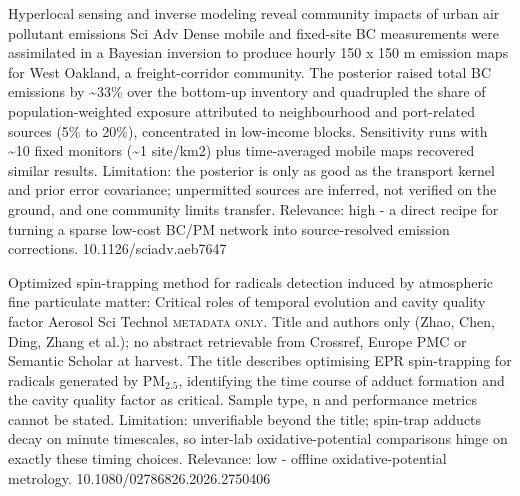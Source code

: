 \documentclass[10pt]{article}
\begin{document}
\par{}\baselineskip{}\baselineskip
{}

{Hyperlocal sensing and inverse modeling reveal community impacts of urban air pollutant emissions}
{Sci Adv}
{Dense mobile and fixed-site BC measurements were assimilated in a Bayesian inversion to produce hourly 150 x 150 m emission maps for West Oakland, a freight-corridor community. The posterior raised total BC emissions by \textasciitilde{}33\% over the bottom-up inventory and quadrupled the share of population-weighted exposure attributed to neighbourhood and port-related sources (5\% to 20\%), concentrated in low-income blocks. Sensitivity runs with \textasciitilde{}10 fixed monitors (\textasciitilde{}1 site/km2) plus time-averaged mobile maps recovered similar results. Limitation: the posterior is only as good as the transport kernel and prior error covariance; unpermitted sources are inferred, not verified on the ground, and one community limits transfer. Relevance: high - a direct recipe for turning a sparse low-cost BC/PM network into source-resolved emission corrections.}
{10.1126/sciadv.aeb7647}

{Optimized spin-trapping method for radicals detection induced by atmospheric fine particulate matter: Critical roles of temporal evolution and cavity quality factor}
{Aerosol Sci Technol}
{\textsc{metadata only.} Title and authors only (Zhao, Chen, Ding, Zhang et al.); no abstract retrievable from Crossref, Europe PMC or Semantic Scholar at harvest. The title describes optimising EPR spin-trapping for radicals generated by PM$_{2.5}$, identifying the time course of adduct formation and the cavity quality factor as critical. Sample type, n and performance metrics cannot be stated. Limitation: unverifiable beyond the title; spin-trap adducts decay on minute timescales, so inter-lab oxidative-potential comparisons hinge on exactly these timing choices. Relevance: low - offline oxidative-potential metrology.}
{10.1080/02786826.2026.2750406}

\par{}\baselineskip{}\baselineskip
{}
\end{document}
